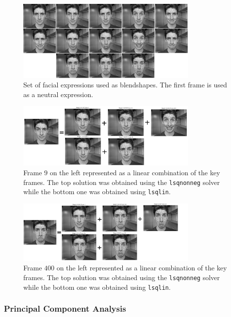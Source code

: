 \begin{figure}[htbp!]
\centering
\includegraphics[width=0.8\textwidth]{img/weights/2D/basis/all.png}
	\caption{Set of facial expressions used as blendshapes. The first frame is used as a neutral expression.}
	\label{fig:2Dblends}
\end{figure}
\begin{figure}[htbp!]
\centering
\includegraphics[width=0.8\textwidth]{img/weights/2D/frame_10/all.png}
	\caption{Frame $9$ on the left represented as a linear combination of the key frames. The top solution was obtained using the \texttt{lsqnonneg} solver while the bottom one was obtained using \texttt{lsqlin}.}
	\label{fig:frame10}
\end{figure}

\begin{figure}[htbp!]
\centering
\includegraphics[width=0.8\textwidth]{img/weights/2D/frame_400/all.png}
	\caption{Frame $400$ on the left represented as a linear combination of the key frames. The top solution was obtained using the \texttt{lsqnonneg} solver while the bottom one was obtained using \texttt{lsqlin}.}
	\label{fig:frame400}
\end{figure}
\subsubsection{Principal Component Analysis}

